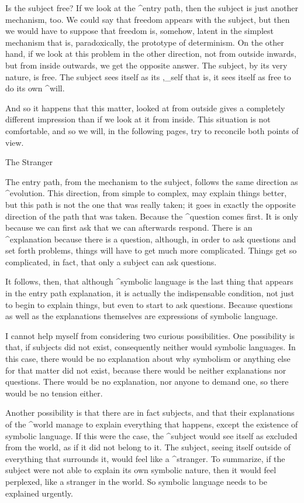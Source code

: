 Is the subject free? If we look at the ^{entry path}, then the subject
is just another mechanism, too. We could say that freedom appears with
the subject, but then we would have to suppose that freedom is, somehow,
latent in the simplest mechanism that is, paradoxically, the prototype
of determinism. On the other hand, if we look at this problem in the
other direction, not from outside inwards, but from inside outwards, we
get the opposite answer. The subject, by its very nature, is free. The
subject sees itself as its ,_{self} that is, it sees
itself as free to do its own ^{will}.

And so it happens that this matter, looked at from outside gives a
completely different impression than if we look at it from inside. This
situation is not comfortable, and so we will, in the following pages,
try to reconcile both points of view.


\Section The Stranger

The entry path, from the mechanism to the subject, follows the same
direction as ^{evolution}. This direction, from simple to complex, may
explain things better, but this path is not the one that was really
taken; it goes in exactly the opposite direction of the path that was
taken. Because the ^{question} comes first. It is only because we can
first ask that we can afterwards respond. There is an ^{explanation}
because there is a question, although, in order to ask questions and set
forth problems, things will have to get much more complicated. Things
get so complicated, in fact, that only a subject can ask questions.

It follows, then, that although ^{symbolic language} is the last thing
that appears in the entry path explanation, it is actually the
indispensable condition, not just to begin to explain things, but even
to start to ask questions. Because questions as well as the explanations
themselves are expressions of symbolic language.

I cannot help myself from considering two curious possibilities. One
possibility is that, if subjects did not exist, consequently neither
would symbolic languages. In this case, there would be no explanation
about why symbolism or anything else for that matter did not exist,
because there would be neither explanations nor questions. There would
be no explanation, nor anyone to demand one, so there would be no
tension either.

Another possibility is that there are in fact subjects, and that their
explanations of the ^{world} manage to explain everything that happens,
except the existence of symbolic language. If this were the case, the
^{subject} would see itself as excluded from the world, as if it did not
belong to it. The subject, seeing itself outside of everything that
surrounds it, would feel like a ^{stranger}. To summarize, if the
subject were not able to explain its own symbolic nature, then it would
feel perplexed, like a stranger in the world. So symbolic language needs
to be explained urgently.


